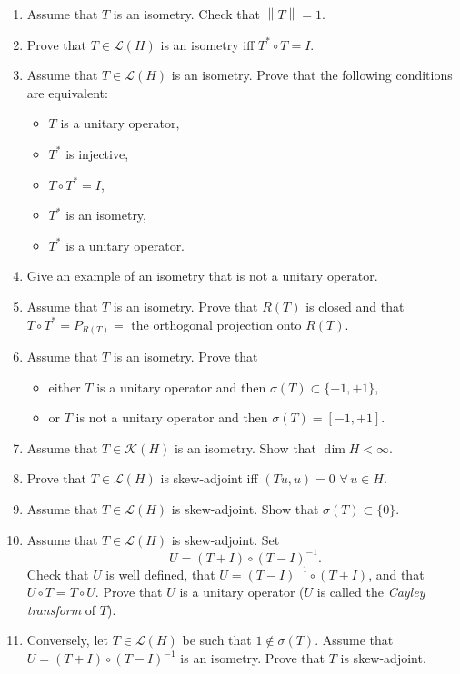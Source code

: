 \documentclass[12pt]{article}
\newcommand{\norm}[1]{\left\|#1\right\|}
\begin{document}
\begin{enumerate}
\item Assume that $T$ is an isometry. Check that $\norm{T} = 1$.
 
\item Prove that $T \in \mathcal{L}(H)$ is an isometry iff $T^* \circ T = I$.
 
\item Assume that $T \in \mathcal{L}(H)$ is an isometry. Prove that the following conditions are
equivalent:
\begin{itemize}
    \item[(a)] $T$ is a unitary operator,
    \item[(b)] $T^*$ is injective,
    \item[(c)] $T \circ T^* = I$,
    \item[(d)] $T^*$ is an isometry,
    \item[(e)] $T^*$ is a unitary operator.
\end{itemize}
 
\item Give an example of an isometry that is not a unitary operator.
 
 
\item Assume that $T$ is an isometry. Prove that $R(T)$ is closed and that
$T \circ T^* = P_{R(T)} =$ the orthogonal projection onto $R(T)$.
 
\item Assume that $T$ is an isometry. Prove that
\begin{itemize}
    \item[] either $T$ is a unitary operator and then $\sigma(T) \subset \{-1,+1\}$,
    \item[] or $T$ is not a unitary operator and then $\sigma(T) = [-1,+1]$.
\end{itemize}
 
\item Assume that $T \in \mathcal{K}(H)$ is an isometry. Show that $\dim H < \infty$.
 
\item Prove that $T \in \mathcal{L}(H)$ is skew-adjoint iff $(Tu, u) = 0$ $\forall\, u \in H$.
 
\item Assume that $T \in \mathcal{L}(H)$ is skew-adjoint. Show that $\sigma(T) \subset \{0\}$.
 
 
\item Assume that $T \in \mathcal{L}(H)$ is skew-adjoint. Set
\[
U = (T + I) \circ (T - I)^{-1}.
\]
Check that $U$ is well defined, that $U = (T-I)^{-1} \circ (T+I)$, and that
$U \circ T = T \circ U$. Prove that $U$ is a unitary operator ($U$ is called the
\emph{Cayley transform} of $T$).
 
\item Conversely, let $T \in \mathcal{L}(H)$ be such that $1 \notin \sigma(T)$. Assume that
$U = (T+I) \circ (T-I)^{-1}$ is an isometry. Prove that $T$ is skew-adjoint.
\end{enumerate}
 
\end{document}
